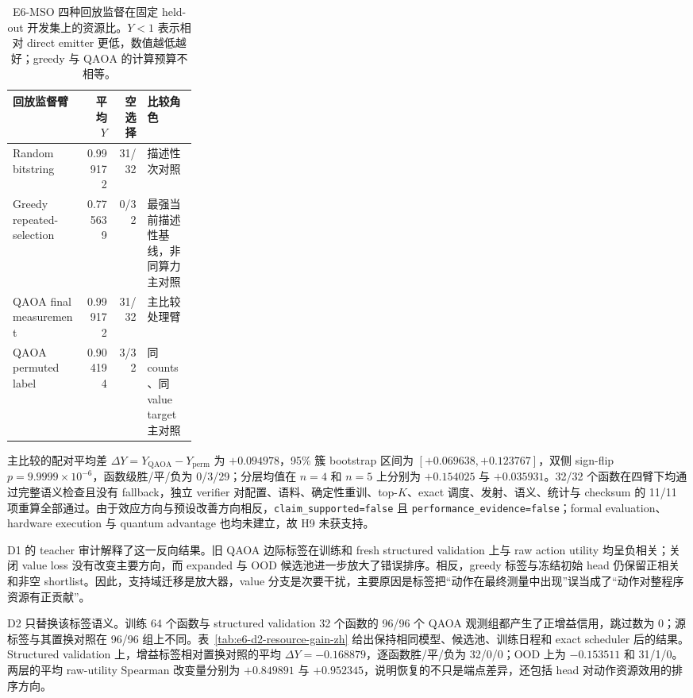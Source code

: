 \documentclass[UTF8,fontset=fandol,11pt]{ctexart}
\newcommand{\qaoa}{\ensuremath{\mathrm{QAOA}}}
\begin{document}
\begin{table}[H]
\centering
\small
\caption{E6-MSO 四种回放监督在固定 held-out 开发集上的资源比。$Y<1$ 表示相对 direct emitter 更低，数值越低越好；greedy 与 \qaoa{} 的计算预算不相等。}
\label{tab:e6-replay-head-zh}
\begin{tabularx}{\linewidth}{>{\raggedright\arraybackslash}Xrr>{\raggedright\arraybackslash}p{0.27\linewidth}}
\toprule
回放监督臂 & 平均 $Y$ & 空选择 & 比较角色 \\
\midrule
Random bitstring & 0.999172 & 31/32 & 描述性次对照 \\
Greedy repeated-selection & 0.775639 & 0/32 & 最强当前描述性基线，非同算力主对照 \\
\qaoa{} final measurement & 0.999172 & 31/32 & 主比较处理臂 \\
\qaoa{} permuted label & 0.904194 & 3/32 & 同 counts、同 value target 主对照 \\
\bottomrule
\end{tabularx}
\end{table}

主比较的配对平均差 $\Delta Y=Y_{\mathrm{QAOA}}-Y_{\mathrm{perm}}$ 为 $+0.094978$，95\% 簇 bootstrap 区间为 $[+0.069638,+0.123767]$，双侧 sign-flip $p=9.9999\times10^{-6}$，函数级胜/平/负为 0/3/29；分层均值在 $n=4$ 和 $n=5$ 上分别为 $+0.154025$ 与 $+0.035931$。32/32 个函数在四臂下均通过完整语义检查且没有 fallback，独立 verifier 对配置、语料、确定性重训、top-$K$、exact 调度、发射、语义、统计与 checksum 的 11/11 项重算全部通过。由于效应方向与预设改善方向相反，\texttt{claim\_supported=false} 且 \texttt{performance\_evidence=false}；formal evaluation、hardware execution 与 quantum advantage 也均未建立，故 H9 未获支持。

D1 的 teacher 审计解释了这一反向结果。旧 QAOA 边际标签在训练和 fresh structured validation 上与 raw action utility 均呈负相关；关闭 value loss 没有改变主要方向，而 expanded 与 OOD 候选池进一步放大了错误排序。相反，greedy 标签与冻结初始 head 仍保留正相关和非空 shortlist。因此，支持域迁移是放大器，value 分支是次要干扰，主要原因是标签把“动作在最终测量中出现”误当成了“动作对整程序资源有正贡献”。

D2 只替换该标签语义。训练 64 个函数与 structured validation 32 个函数的 96/96 个 QAOA 观测组都产生了正增益信用，跳过数为 0；源标签与其置换对照在 96/96 组上不同。表~\ref{tab:e6-d2-resource-gain-zh} 给出保持相同模型、候选池、训练日程和 exact scheduler 后的结果。Structured validation 上，增益标签相对置换对照的平均 $\Delta Y=-0.168879$，逐函数胜/平/负为 32/0/0；OOD 上为 $-0.153511$ 和 31/1/0。两层的平均 raw-utility Spearman 改变量分别为 $+0.849891$ 与 $+0.952345$，说明恢复的不只是端点差异，还包括 head 对动作资源效用的排序方向。
\end{document}

